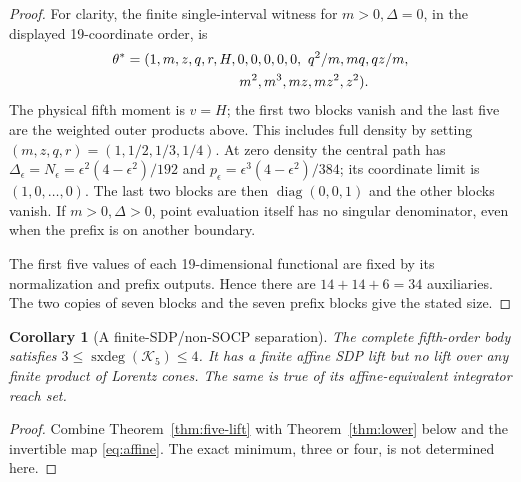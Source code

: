 \documentclass[pdflatex,sn-mathphys-num]{sn-jnl}
\theoremstyle{thmstyleone}
\newtheorem{corollary}[theorem]{Corollary}
\theoremstyle{thmstyletwo}\newtheorem{remark}[theorem]{Remark}
\newcommand{\K}{\mathcal K}
\newcommand{\sxdeg}{\operatorname{sxdeg}}
\begin{document}
\begin{proof}
For clarity, the finite single-interval witness for $m>0,\Delta=0$,
in the displayed 19-coordinate order, is
\[
 \begin{aligned}
 \theta^*={}&(1,m,z,q,r,H,0,0,0,0,0,\ q^2/m,mq,qz/m,\\
             &\hspace{24mm}m^2,m^3,mz,mz^2,z^2).
 \end{aligned}
\]
The physical fifth moment is $v=H$; the first two blocks vanish and the
last five are the weighted outer products above. This includes full density
by setting $(m,z,q,r)=(1,1/2,1/3,1/4)$. At zero density the central path has
$\Delta_\epsilon=N_\epsilon=\epsilon^2(4-\epsilon^2)/192$ and
$p_\epsilon=\epsilon^3(4-\epsilon^2)/384$; its coordinate limit is
$(1,0,\ldots,0)$. The last two blocks are then $\operatorname{diag}(0,0,1)$
and the other blocks vanish. If $m>0,\Delta>0$, point evaluation itself
has no singular denominator, even when the prefix is on another boundary.

The first five values of each 19-dimensional functional are fixed by its
normalization and prefix outputs. Hence there are $14+14+6=34$ auxiliaries.
The two copies of seven blocks and the seven prefix blocks give the stated size.
\end{proof}

\begin{corollary}[A finite-SDP/non-SOCP separation]\label{cor:five-separation}
The complete fifth-order body satisfies $3\le\sxdeg(\K_5)\le4$.
It has a finite affine SDP lift but no lift over any finite product of Lorentz
cones. The same is true of its affine-equivalent integrator reach set.
\end{corollary}
\begin{proof}
Combine Theorem~\ref{thm:five-lift} with Theorem~\ref{thm:lower} below and
the invertible map \eqref{eq:affine}. The exact minimum, three or four,
is not determined here.
\end{proof}
\end{document}
